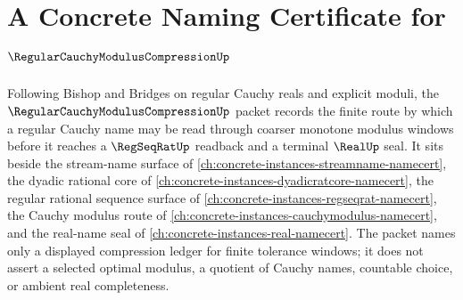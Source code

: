 \chapter{A Concrete Naming Certificate for $\RegularCauchyModulusCompressionUp$}
\label{ch:concrete-instances-regular-cauchy-modulus-compression-namecert}

Following Bishop and Bridges on regular Cauchy reals and explicit moduli, the $\RegularCauchyModulusCompressionUp$ packet records the finite route by which a regular Cauchy name may be read through coarser monotone modulus windows before it reaches a $\RegSeqRatUp$ readback and a terminal $\RealUp$ seal. It sits beside the stream-name surface of \autoref{ch:concrete-instances-streamname-namecert}, the dyadic rational core of \autoref{ch:concrete-instances-dyadicratcore-namecert}, the regular rational sequence surface of \autoref{ch:concrete-instances-regseqrat-namecert}, the Cauchy modulus route of \autoref{ch:concrete-instances-cauchymodulus-namecert}, and the real-name seal of \autoref{ch:concrete-instances-real-namecert}. The packet names only a displayed compression ledger for finite tolerance windows; it does not assert a selected optimal modulus, a quotient of Cauchy names, countable choice, or ambient real completeness.

